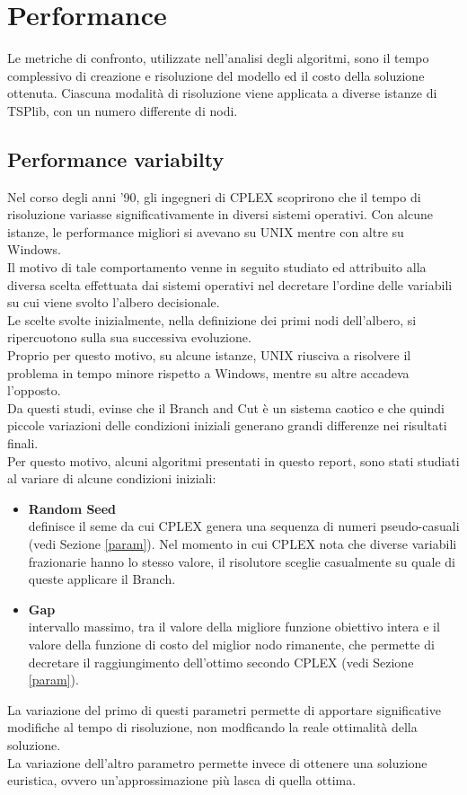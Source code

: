 \chapter{Performance}\label{PERF_PROF}
Le metriche di confronto, utilizzate nell'analisi degli algoritmi, sono il tempo complessivo di creazione e risoluzione del modello ed il costo della soluzione ottenuta. Ciascuna modalità di risoluzione viene applicata a diverse istanze di TSPlib, con un numero differente di nodi.  
\section{Performance variabilty}
Nel corso degli anni '90, gli ingegneri di CPLEX scoprirono che il tempo di risoluzione variasse significativamente in diversi sistemi operativi. Con alcune istanze, le performance migliori si avevano su UNIX mentre con altre su Windows.\\
Il motivo di tale comportamento venne in seguito studiato ed attribuito alla diversa scelta effettuata dai sistemi operativi nel decretare l'ordine delle variabili su cui viene svolto l'albero decisionale.\\
Le scelte svolte inizialmente, nella definizione dei primi nodi dell'albero, si ripercuotono sulla sua successiva evoluzione.\\
Proprio per questo motivo, su alcune istanze, UNIX riusciva a risolvere il problema in tempo minore rispetto a Windows, mentre su altre accadeva l'opposto.\\
Da questi studi, evinse che il Branch and Cut è un sistema caotico e che quindi piccole variazioni delle condizioni iniziali generano grandi differenze nei risultati finali.\\
Per questo motivo, alcuni algoritmi presentati in questo report, sono stati studiati al variare di alcune condizioni iniziali:
\begin{itemize}
\item{\textbf{Random Seed}\\
definisce il seme da cui CPLEX genera una sequenza di numeri pseudo-casuali (vedi Sezione \ref{param}). Nel momento in cui CPLEX nota che diverse variabili frazionarie hanno lo stesso valore, il risolutore sceglie casualmente su quale di queste applicare il Branch.}
\item{\textbf{Gap}\\
intervallo massimo, tra il valore della migliore funzione obiettivo intera e il valore della funzione di costo del miglior nodo rimanente, che permette di decretare il raggiungimento dell'ottimo secondo CPLEX (vedi Sezione \ref{param}).}
\end{itemize}
La variazione del primo di questi parametri permette di apportare significative modifiche al tempo di risoluzione, non modficando la reale ottimalità della soluzione.\\
La variazione dell'altro parametro permette invece di ottenere una soluzione euristica, ovvero un'approssimazione più lasca di quella ottima.
 
